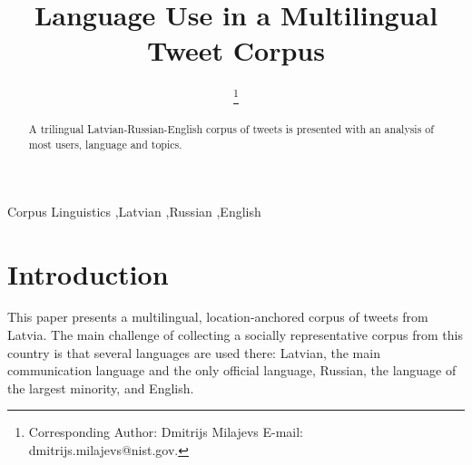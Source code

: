 \documentclass{IOS-Book-Article}
\begin{document}
\begin{frontmatter}              %

\title{Language Use in a Multilingual Tweet Corpus}

\author[A]{ %
  \thanks{Corresponding Author: Dmitrijs Milajevs
    E-mail: dmitrijs.milajevs@nist.gov.}}


\address[A]{Guest Researcher at National Institute of Standards and Technology, Maryland, USA}

\begin{abstract}
A trilingual Latvian-Russian-English corpus of tweets is presented with an analysis of most users, language and topics.
\end{abstract}

\begin{keyword}
Corpus Linguistics \sep Latvian \sep Russian \sep English
\end{keyword}
\end{frontmatter}

\thispagestyle{empty}
\pagestyle{empty}

\section*{Introduction}

This paper presents a multilingual, location-anchored corpus of tweets from Latvia. The main challenge of collecting a socially representative corpus from this country is that several languages are used there: Latvian, the main communication language and the only official language, Russian, the language of the largest minority, and English.
\end{document}
